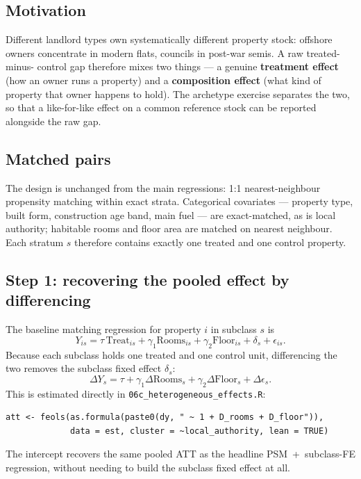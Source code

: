 \documentclass[11pt]{article}
\begin{document}
\subsection{Motivation}
Different landlord types own systematically different property stock: offshore
owners concentrate in modern flats, councils in post-war semis. A raw treated-minus-
control gap therefore mixes two things --- a genuine \textbf{treatment effect} (how an
owner runs a property) and a \textbf{composition effect} (what kind of property that
owner happens to hold). The archetype exercise separates the two, so that a
like-for-like effect on a common reference stock can be reported alongside the raw
gap.

\subsection{Matched pairs}
The design is unchanged from the main regressions: 1:1 nearest-neighbour propensity
matching within exact strata. Categorical covariates --- property type, built form,
construction age band, main fuel --- are exact-matched, as is local authority;
habitable rooms and floor area are matched on nearest neighbour. Each stratum $s$
therefore contains exactly one treated and one control property.

\subsection{Step 1: recovering the pooled effect by differencing}
The baseline matching regression for property $i$ in subclass $s$ is
\begin{equation}
  Y_{is} = \tau\,\mathrm{Treat}_{is} + \gamma_1 \mathrm{Rooms}_{is}
           + \gamma_2 \mathrm{Floor}_{is} + \delta_s + \epsilon_{is}.
\end{equation}
Because each subclass holds one treated and one control unit, differencing the two
removes the subclass fixed effect $\delta_s$:
\begin{equation}
  \Delta Y_s = \tau + \gamma_1 \Delta \mathrm{Rooms}_s
             + \gamma_2 \Delta \mathrm{Floor}_s + \Delta\epsilon_s .
\end{equation}
This is estimated directly in \texttt{06c\_heterogeneous\_effects.R}:
\begin{lstlisting}
att <- feols(as.formula(paste0(dy, " ~ 1 + D_rooms + D_floor")),
             data = est, cluster = ~local_authority, lean = TRUE)
\end{lstlisting}
The intercept recovers the same pooled ATT as the headline PSM~+~subclass-FE
regression, without needing to build the subclass fixed effect at all.
\end{document}
